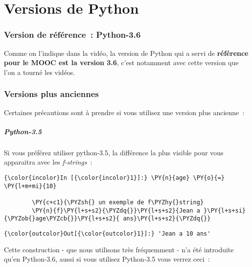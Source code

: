     \hypertarget{versions-de-python}{%
\section{Versions de Python}\label{versions-de-python}}

    \hypertarget{version-de-ruxe9fuxe9rence-python-3.6}{%
\subsubsection{Version de référence~:
Python-3.6}\label{version-de-ruxe9fuxe9rence-python-3.6}}

    Comme on l'indique dans la vidéo, la version de Python qui a servi de
\textbf{référence pour le MOOC est la version 3.6}, c'est notamment avec
cette version que l'on a tourné les vidéos.

    \hypertarget{versions-plus-anciennes}{%
\subsubsection{Versions plus anciennes}\label{versions-plus-anciennes}}

    Certaines précautions sont à prendre si vous utilisez une version plus
ancienne~:

    \hypertarget{python-3.5}{%
\subparagraph{Python-3.5}\label{python-3.5}}

    Si vous préférez utiliser python-3.5, la différence la plus visible pour
vous apparaitra avec les \emph{f-strings}~:

    \begin{Verbatim}[commandchars=\\\{\}]
{\color{incolor}In [{\color{incolor}1}]:} \PY{n}{age} \PY{o}{=} \PY{l+m+mi}{10}
        
        \PY{c+c1}{\PYZsh{} un exemple de f\PYZhy{}string}
        \PY{n}{f}\PY{l+s+s2}{\PYZdq{}}\PY{l+s+s2}{Jean a }\PY{l+s+si}{\PYZob{}age\PYZcb{}}\PY{l+s+s2}{ ans}\PY{l+s+s2}{\PYZdq{}}
\end{Verbatim}


\begin{Verbatim}[commandchars=\\\{\}]
{\color{outcolor}Out[{\color{outcolor}1}]:} 'Jean a 10 ans'
\end{Verbatim}
            
    Cette construction - que nous utilisons très fréquemment - n'a été
introduite qu'en Python-3.6, aussi si vous utilisez Python-3.5 vous
verrez ceci~:


